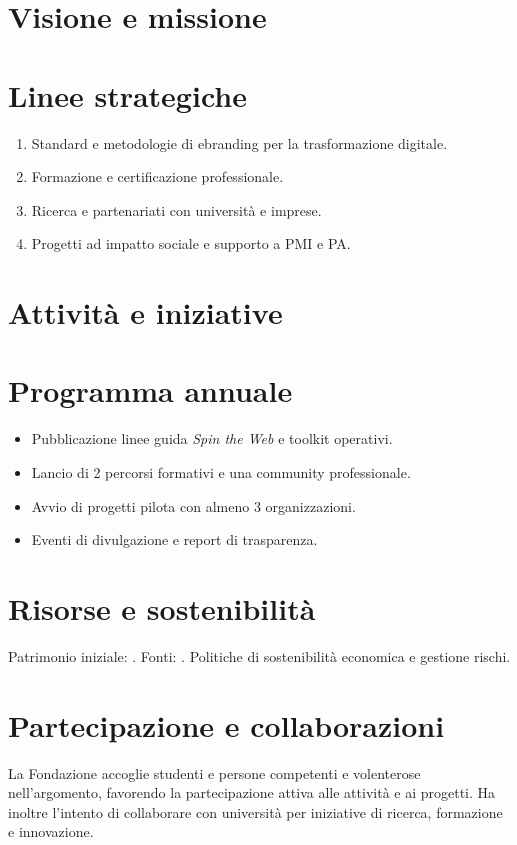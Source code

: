 \begin{center}
\end{center}

\maketitle

\section*{Visione e missione}
\FondazioneMissione

\section*{Linee strategiche}
\begin{enumerate}
  \item Standard e metodologie di ebranding per la trasformazione digitale.
  \item Formazione e certificazione professionale.
  \item Ricerca e partenariati con università e imprese.
  \item Progetti ad impatto sociale e supporto a PMI e PA.
\end{enumerate}

\section*{Attività e iniziative}
\FondazioneAttivita

\section*{Programma annuale}
\begin{itemize}
  \item Pubblicazione linee guida \emph{Spin the Web} e toolkit operativi.
  \item Lancio di 2 percorsi formativi e una community professionale.
  \item Avvio di progetti pilota con almeno 3 organizzazioni.
  \item Eventi di divulgazione e report di trasparenza.
\end{itemize}

\section*{Risorse e sostenibilità}
Patrimonio iniziale: \PatrimonioIniziale. Fonti: \FontiFinanziamento. Politiche di sostenibilità economica e gestione rischi.

\section*{Partecipazione e collaborazioni}
La Fondazione accoglie studenti e persone competenti e volenterose nell’argomento, favorendo la partecipazione attiva alle attività e ai progetti. Ha inoltre l’intento di collaborare con università per iniziative di ricerca, formazione e innovazione.

